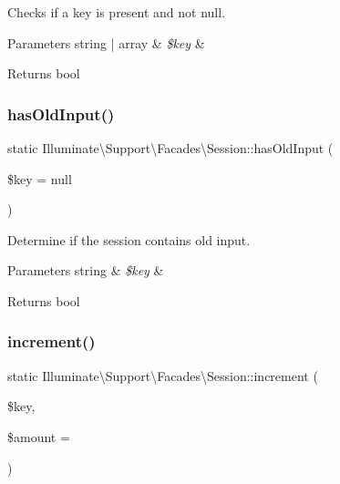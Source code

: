 Checks if a key is present and not null.


\begin{DoxyParams}[1]{Parameters}
string | array & {\em \$key} & \\
\hline
\end{DoxyParams}
\begin{DoxyReturn}{Returns}
bool 
\end{DoxyReturn}
\mbox{\label{class_illuminate_1_1_support_1_1_facades_1_1_session_a06d0004ca97b3b3c533feba7fd112c4e}} 
\subsubsection{\texorpdfstring{has\+Old\+Input()}{hasOldInput()}}
{\footnotesize\ttfamily static Illuminate\textbackslash{}\+Support\textbackslash{}\+Facades\textbackslash{}\+Session\+::has\+Old\+Input (\begin{DoxyParamCaption}\item[{}]{\$key = {\ttfamily null} }\end{DoxyParamCaption})\hspace{0.3cm}{\ttfamily [static]}}

Determine if the session contains old input.


\begin{DoxyParams}[1]{Parameters}
string & {\em \$key} & \\
\hline
\end{DoxyParams}
\begin{DoxyReturn}{Returns}
bool 
\end{DoxyReturn}
\mbox{\label{class_illuminate_1_1_support_1_1_facades_1_1_session_ae328b646d330b4dda3775b922e0859c1}} 
\subsubsection{\texorpdfstring{increment()}{increment()}}
{\footnotesize\ttfamily static Illuminate\textbackslash{}\+Support\textbackslash{}\+Facades\textbackslash{}\+Session\+::increment (\begin{DoxyParamCaption}\item[{}]{\$key,  }\item[{}]{\$amount = {} }\end{DoxyParamCaption})\hspace{0.3cm}{\ttfamily [static]}}


